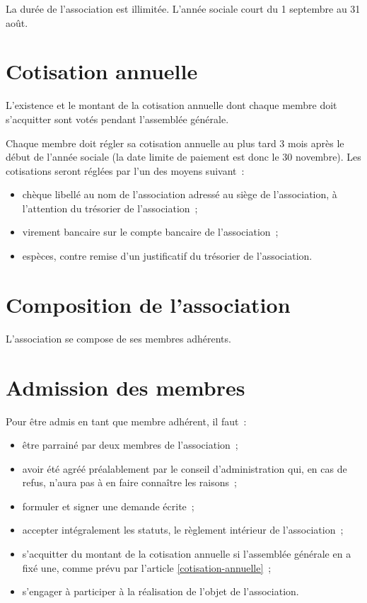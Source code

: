 \documentclass{article}
\begin{document}
La durée de l'association est illimitée. L'année sociale court du
1\ier{} septembre au 31 août.

\section{Cotisation annuelle}
\label{sec:cotisation-annuelle}

L'existence et le montant de la cotisation annuelle dont chaque membre
doit s'acquitter sont votés pendant l'assemblée générale.

Chaque membre doit régler sa cotisation annuelle au plus tard 3 mois
après le début de l'année sociale (la date limite de paiement est donc
le 30 novembre). Les cotisations seront réglées par l'un des moyens
suivant~:

\begin{itemize}
\item chèque libellé au nom de l'association adressé au siège de
  l'association, à l'attention du trésorier de l'association~;
\item virement bancaire sur le compte bancaire de l'association~;
\item espèces, contre remise d’un justificatif du trésorier de
  l'association.
\end{itemize}

\section{Composition de l'association}
\label{sec:composition-de-l-association}

L'association se compose de ses membres adhérents.

\section{Admission des membres}
\label{sec:admission-des-membres}

Pour être admis en tant que membre adhérent, il faut~:

\begin{itemize}
\item être parrainé par deux membres de l'association~;
\item avoir été agréé préalablement par le conseil d'administration
  qui, en cas de refus, n'aura pas à en faire connaître les raisons~;
\item formuler et signer une demande écrite~;
\item accepter intégralement les statuts, le règlement intérieur de
  l'association~;
\item s'acquitter du montant de la cotisation annuelle si l'assemblée
  générale en a fixé une, comme prévu par l'article
  \ref{cotisation-annuelle}~;
\item s'engager à participer à la réalisation de l'objet de
  l'association.
\end{itemize}
\end{document}
